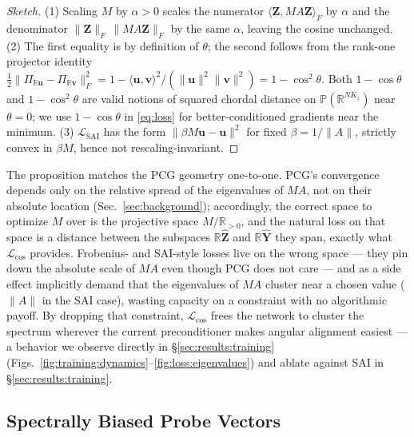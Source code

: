 \documentclass[acmtog,anonymous,review]{acmart}
\theoremstyle{plain}
\begin{document}
\begin{proof}[Sketch]
(1) Scaling $M$ by $\alpha\!>\!0$ scales the numerator
$\langle\mathbf{Z},MA\mathbf{Z}\rangle_F$ by $\alpha$ and the denominator
$\|\mathbf{Z}\|_F\,\|MA\mathbf{Z}\|_F$ by the same $\alpha$, leaving the cosine unchanged.
(2) The first equality is by definition of $\theta$; the second follows from the rank-one
projector identity
$\tfrac{1}{2}\|\Pi_{\mathbb{R}\mathbf{u}}-\Pi_{\mathbb{R}\mathbf{v}}\|_F^2
= 1 - \langle\mathbf{u},\mathbf{v}\rangle^2/(\|\mathbf{u}\|^2\|\mathbf{v}\|^2) = 1-\cos^2\theta$.
Both $1\!-\!\cos\theta$ and $1\!-\!\cos^2\theta$ are valid notions of squared chordal
distance on $\mathbb{P}(\mathbb{R}^{NK_z})$ near $\theta\!=\!0$; we use $1-\cos\theta$ in
\eqref{eq:loss} for better-conditioned gradients near the minimum.
(3) $\mathcal{L}_{\mathrm{SAI}}$ has the form $\|\beta M\mathbf{u}-\mathbf{u}\|^2$ for fixed
$\beta\!=\!1/\|A\|$, strictly convex in $\beta M$, hence not rescaling-invariant.
\end{proof}

\noindent
The proposition matches the PCG geometry one-to-one. PCG's convergence depends only on the
relative spread of the eigenvalues of $MA$, not on their absolute location
(Sec.~\ref{sec:background}); accordingly, the correct space to optimize $M$ over is the
projective space $M/\mathbb{R}_{>0}$, and the natural loss on that space is a distance
between the subspaces $\mathbb{R}\widehat{\mathbf{Z}}$ and $\mathbb{R}\widehat{\mathbf{Y}}$
they span, exactly what $\mathcal{L}_{\cos}$ provides. Frobenius- and SAI-style losses live
on the wrong space --- they pin down the absolute scale of $MA$ even though PCG does not
care --- and as a side effect implicitly demand that the eigenvalues of $MA$ cluster near a
chosen value ($\|A\|$ in the SAI case), wasting capacity on a constraint with no algorithmic
payoff. By dropping that constraint, $\mathcal{L}_{\cos}$ frees the network to cluster the
spectrum wherever the current preconditioner makes angular alignment easiest --- a behavior
we observe directly in \S\ref{sec:results:training}
(Figs.~\ref{fig:training:dynamics}--\ref{fig:loss:eigenvalues}) and ablate against SAI in
\S\ref{sec:results:training}.

\subsection{Spectrally Biased Probe Vectors}
\end{document}
